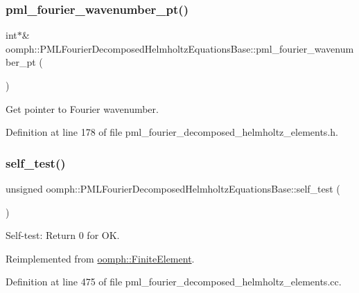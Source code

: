\subsubsection{\texorpdfstring{pml\+\_\+fourier\+\_\+wavenumber\+\_\+pt()}{pml\_fourier\_wavenumber\_pt()}}
{\footnotesize\ttfamily int$\ast$\& oomph\+::\+P\+M\+L\+Fourier\+Decomposed\+Helmholtz\+Equations\+Base\+::pml\+\_\+fourier\+\_\+wavenumber\+\_\+pt (\begin{DoxyParamCaption}{ }\end{DoxyParamCaption})\hspace{0.3cm}{\ttfamily [inline]}}



Get pointer to Fourier wavenumber. 



Definition at line 178 of file pml\+\_\+fourier\+\_\+decomposed\+\_\+helmholtz\+\_\+elements.\+h.

\mbox{\label{classoomph_1_1PMLFourierDecomposedHelmholtzEquationsBase_a9fd7dac4497a8c7fb47a02407dedf30f}} 
\subsubsection{\texorpdfstring{self\+\_\+test()}{self\_test()}}
{\footnotesize\ttfamily unsigned oomph\+::\+P\+M\+L\+Fourier\+Decomposed\+Helmholtz\+Equations\+Base\+::self\+\_\+test (\begin{DoxyParamCaption}{ }\end{DoxyParamCaption})\hspace{0.3cm}{\ttfamily [virtual]}}



Self-\/test\+: Return 0 for OK. 



Reimplemented from \hyperlink{classoomph_1_1FiniteElement_af94c5a5e22175d5420b33b3b79e46ed3}{oomph\+::\+Finite\+Element}.



Definition at line 475 of file pml\+\_\+fourier\+\_\+decomposed\+\_\+helmholtz\+\_\+elements.\+cc.



